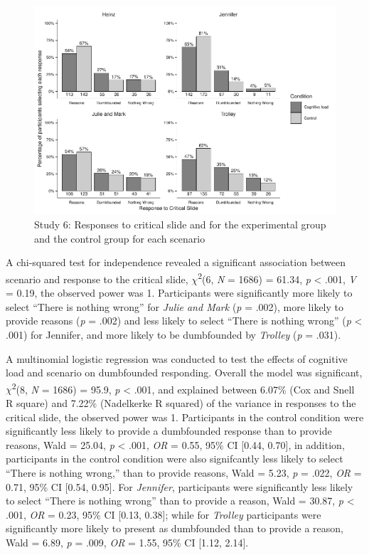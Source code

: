 \documentclass[
  american,
  man]{apa7}
\begin{document}
\begin{figure}
\centering
\includegraphics{Study_6_files/figure-latex/S6ch5S6fig2criticalconditionb-1.pdf}
\caption{\label{fig:S6ch5S6fig2criticalconditionb}Study 6: Responses to critical slide and for the experimental group and the control group for each scenario}
\end{figure}

A chi-squared test for independence revealed a significant association between scenario and response to the critical slide, \(\chi\)\textsuperscript{2}(6, \emph{N} = 1686) = 61.34, \emph{p} \textless{} .001, \emph{V} = 0.19, the observed power was 1. Participants were significantly more likely to select ``There is nothing wrong'' for \emph{Julie and Mark} (\emph{p} = .002), more likely to provide reasons (\emph{p} = .002) and less likely to select ``There is nothing wrong'' (\emph{p} \textless{} .001) for Jennifer, and more likely to be dumbfounded by \emph{Trolley} (\emph{p} = .031).

A multinomial logistic regression was conducted to test the effects of cognitive load and scenario on dumbfounded responding. Overall the model was significant, \(\chi\)\textsuperscript{2}(8, \emph{N} = 1686) = 95.9, \emph{p} \textless{} .001, and explained between 6.07\% (Cox and Snell R square) and 7.22\% (Nadelkerke R squared) of the variance in responses to the critical slide, the observed power was 1. Participants in the control condition were significantly less likely to provide a dumbfounded response than to provide reasons, Wald = 25.04, \emph{p} \textless{} .001, \emph{OR} = 0.55, 95\% CI {[}0.44, 0.70{]}, in addition, participants in the control condition were also signifcantly less likely to select ``There is nothing wrong,'' than to provide reasons, Wald = 5.23, \emph{p} = .022, \emph{OR} = 0.71, 95\% CI {[}0.54, 0.95{]}. For \emph{Jennifer}, participants were significantly less likely to select ``There is nothing wrong'' than to provide a reason, Wald = 30.87, \emph{p} \textless{} .001, \emph{OR} = 0.23, 95\% CI {[}0.13, 0.38{]}; while for \emph{Trolley} participants were significantly more likely to present as dumbfounded than to provide a reason, Wald = 6.89, \emph{p} = .009, \emph{OR} = 1.55, 95\% CI {[}1.12, 2.14{]}.
\end{document}

